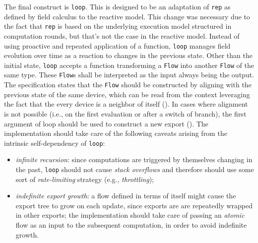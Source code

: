 The final construct is \texttt{loop}.
%
This is designed to be an adaptation of \texttt{rep} as defined by field calculus to the reactive model.
%
This change was necessary due to the fact that \texttt{rep} is based on the underlying execution model structured in computation rounds, but that's not the case in the reactive model.
%
Instead of using proactive and repeated application of a function, \texttt{loop} manages field evolution over time as a reaction to changes in the previous state.
%
Other than the initial state, \texttt{loop} accepts a function transforming a \texttt{Flow} into another \texttt{Flow} of the same type.
%
These \texttt{Flow}s shall be interpreted as the input always being  the output.
%
The specification states that the  \texttt{Flow} should be constructed by aligning with the previous state of the same device, which can be read from the context leveraging the fact that the every device is a neighbor of itself ().
%
In cases where alignment is not possible (i.e., on the first evaluation or after a switch of branch), the first argument of loop should be used to construct a new export ().
%
The implementation should take care of the following caveats arising from the intrinsic self-dependency of \texttt{loop}:
%
\begin{itemize}
    \item \textit{infinite recursion}: since computations are triggered by themselves changing in the past, \texttt{loop} should not cause \textit{stack overflows} and therefore should use some sort of \textit{rate-limiting} strategy (e.g., \textit{throttling});
    \item \textit{indefinite export growth}: a flow defined in terms of itself might cause the export tree to grow on each update, since exports are are repeatedly wrapped in other exports; the implementation should take care of passing an \textit{atomic} flow as an input to the subsequent computation, in order to avoid indefinite growth.
\end{itemize}
%
